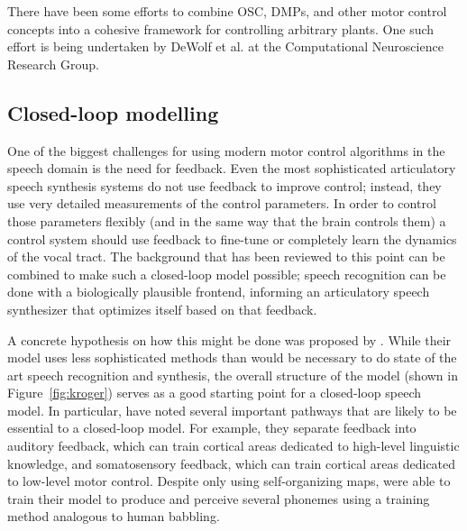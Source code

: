 \documentclass{article}
\begin{document}
There have been some efforts
to combine OSC, DMPs, and other motor control concepts
into a cohesive framework
for controlling arbitrary plants.
One such effort is being undertaken
by DeWolf et al. at the
Computational Neuroscience Research Group.

\subsection{Closed-loop modelling}
\label{subsec:closed-loop}

One of the biggest challenges
for using modern motor control algorithms
in the speech domain
is the need for feedback.
Even the most sophisticated
articulatory speech synthesis systems
do not use feedback to improve control;
instead, they use very detailed measurements
of the control parameters.
In order to control those parameters flexibly
(and in the same way that the brain controls them)
a control system should use feedback
to fine-tune or completely learn
the dynamics of the vocal tract.
The background that has been reviewed
to this point can be combined
to make such a closed-loop model possible;
speech recognition can be done
with a biologically plausible frontend,
informing an articulatory speech synthesizer
that optimizes itself based on that feedback.

A concrete hypothesis on how
this might be done was proposed by
\citet{kroger2009}.
While their model uses less sophisticated
methods than would be necessary
to do state of the art
speech recognition and synthesis,
the overall structure of the model
(shown in Figure~\ref{fig:kroger})
serves as a good starting point
for a closed-loop speech model.
In particular, \citeauthor{kroger2009} have
noted several important pathways
that are likely to be essential
to a closed-loop model.
For example, they separate feedback
into auditory feedback,
which can train cortical areas
dedicated to high-level linguistic knowledge,
and somatosensory feedback,
which can train cortical areas
dedicated to low-level motor control.
Despite only using self-organizing maps,
\citeauthor{kroger2009} were able to train their model
to produce and perceive several phonemes
using a training method analogous
to human babbling.
\end{document}
